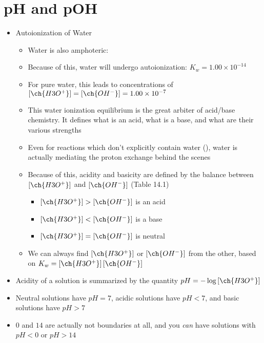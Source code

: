 \documentclass[12pt, openany, letterpaper]{memoir}
\begin{document}
\section{pH and pOH}
\begin{itemize}
  \item Autoionization of Water
    \begin{itemize}
      \item Water is also amphoteric: 
      \item Because of this, water will undergo autoionization:  \hspace{1em} $K_w=1.00\times10^{-14}$
      \item For pure water, this leads to concentrations of $\left[\ch{H3O^+}\right]=\left[\ch{OH^-}\right]=1.00\times10^{-7}$
      \item This water ionization equilibrium is the great arbiter of acid/base chemistry. It defines what is an acid, what is a base, and what are their various strengths
      \item Even for reactions which don't explicitly contain water (), water is actually mediating the proton exchange behind the scenes
      \item Because of this, acidity and basicity are defined by the balance between $\left[\ch{H3O^+}\right]$ and $\left[\ch{OH^-}\right]$ (Table 14.1)
      \begin{itemize}
        \item $\left[\ch{H3O^+}\right] > \left[\ch{OH^-}\right]$ is an acid
        \item $\left[\ch{H3O^+}\right] < \left[\ch{OH^-}\right]$ is a base
        \item $\left[\ch{H3O^+}\right] = \left[\ch{OH^-}\right]$ is neutral
      \end{itemize}
      \item We can always find $\left[\ch{H3O^+}\right]$ or $\left[\ch{OH^-}\right]$ from the other, based on $K_w = \left[\ch{H3O^+}\right]\left[\ch{OH^-}\right]$
    \end{itemize}
  \item Acidity of a solution is summarized by the quantity $pH = -\log\left[\ch{H3O^+}\right]$
	\item Neutral solutions have $pH=7$, acidic solutions have $pH<7$, and basic solutions have $pH>7$
	\item $0$ and $14$ are actually not boundaries at all, and you \emph{can} have solutions with $pH<0$ or $pH>14$

\end{itemize}
\end{document}
